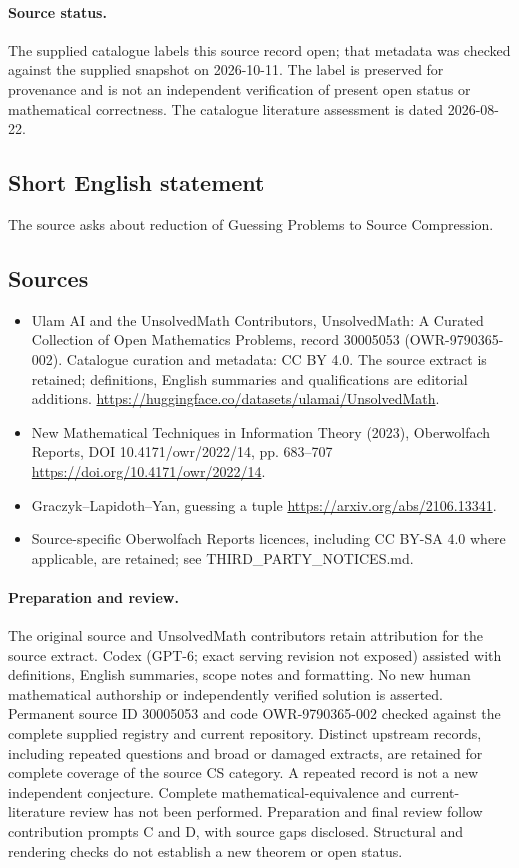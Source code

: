 \documentclass[11pt]{article}
\begin{document}
\paragraph{Source status.}
The supplied catalogue labels this source record open; that metadata was checked against the supplied snapshot on 2026-10-11. The label is preserved for provenance and is not an independent verification of present open status or mathematical correctness. The catalogue literature assessment is dated 2026-08-22.
\subsection{Short English statement}
The source asks about reduction of Guessing Problems to Source Compression.
\subsection{Sources}
\begin{itemize}
\item[S1] Ulam AI and the UnsolvedMath Contributors, UnsolvedMath: A Curated Collection of Open Mathematics Problems, record 30005053 (OWR-9790365-002). Catalogue curation and metadata: CC BY 4.0. The source extract is retained; definitions, English summaries and qualifications are editorial additions.
\url{https://huggingface.co/datasets/ulamai/UnsolvedMath}.
\item[S2] New Mathematical Techniques in Information Theory (2023), Oberwolfach Reports, DOI 10.4171/owr/2022/14, pp. 683--707
\url{https://doi.org/10.4171/owr/2022/14}.
\item[S3] Graczyk--Lapidoth--Yan, guessing a tuple
\url{https://arxiv.org/abs/2106.13341}.
\item Source-specific Oberwolfach Reports licences, including CC BY-SA 4.0 where applicable, are retained; see THIRD\_PARTY\_NOTICES.md.
\end{itemize}
\paragraph{Preparation and review.}
The original source and UnsolvedMath contributors retain attribution for the source extract. Codex (GPT-6; exact serving revision not exposed) assisted with definitions, English summaries, scope notes and formatting. No new human mathematical authorship or independently verified solution is asserted. Permanent source ID 30005053 and code OWR-9790365-002 checked against the complete supplied registry and current repository. Distinct upstream records, including repeated questions and broad or damaged extracts, are retained for complete coverage of the source CS category. A repeated record is not a new independent conjecture. Complete mathematical-equivalence and current-literature review has not been performed. Preparation and final review follow contribution prompts C and D, with source gaps disclosed. Structural and rendering checks do not establish a new theorem or open status.
\label{end:30005053}
\end{document}
